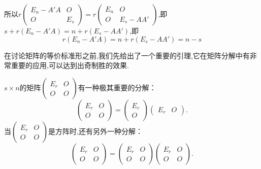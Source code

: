 \documentclass{article}
\begin{document}
所以$r \left(
    \begin{array}{cc}
            E_n - A'A & O   \\
            O         & E_s
        \end{array}
    \right)
    =
    r \left(
    \begin{array}{cc}
            E_n & O         \\
            O   & E_s - AA'
        \end{array}
    \right)$,即$s + r \left(E_n - A'A\right) = n + r \left(E_s - AA'\right)$,即
\begin{equation*}
    r \left(E_n - A'A\right) = n + r \left(E_s - AA'\right) = n - s
\end{equation*}


\vspace{2ex}

\vspace{1ex}
在讨论矩阵的等价标准形之前,我们先给出了一个重要的引理,它在矩阵分解中有非常重要的应用,可以达到出奇制胜的效果.

\vspace{1ex}
 $s \times n$的矩阵$\left(\begin{array}{cc}
            E_r & O \\
            O   & O
        \end{array}\right)$有一种极其重要的分解：
\begin{equation*}
    \left(
    \begin{array}{cc}
        E_r & O \\
        O   & O
    \end{array}
    \right)
    =
    \left(
    \begin{array}{c}
        E_r \\
        O
    \end{array}
    \right)
    \left(
    \begin{array}{cc}
        E_r & O
    \end{array}
    \right).
\end{equation*}
当$\left(
    \begin{array}{cc}
            E_r & O \\
            O   & O
        \end{array}
    \right)$是方阵时,还有另外一种分解：
\begin{equation*}
    \left(
    \begin{array}{cc}
        E_r & O \\
        O   & O
    \end{array}
    \right)
    =
    \left(
    \begin{array}{cc}
        E_r & O \\
        O   & O
    \end{array}
    \right)
    \left(
    \begin{array}{cc}
        E_r & O \\
        O   & O
    \end{array}
    \right).
\end{equation*}
\end{document}
